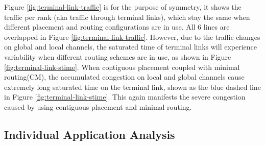 \documentclass[conference,compsoc]{IEEEtran}
\begin{document}
Figure \ref{fig:terminal-link-traffic} is for the purpose of symmetry, it shows the traffic per rank (aka traffic through terminal links), which stay the same when different placement and routing configurations are in use. All 6 lines are overlapped in Figure \ref{fig:terminal-link-traffic}. However, due to the traffic changes on global and local channels, the saturated time of terminal links will experience variability when different routing schemes are in use, as shown in Figure \ref{fig:terminal-link-stime}. When contiguous placement coupled with minimal routing(CM), the accumulated congestion on local and global channels cause extremely long saturated time on the terminal link, shown as the blue dashed line in Figure \ref{fig:terminal-link-stime}. This again manifests the severe congestion caused by using contiguous placement and minimal routing. 


\subsection{Individual Application Analysis}
\label{sec: workload-1 app analysis}
\end{document}
